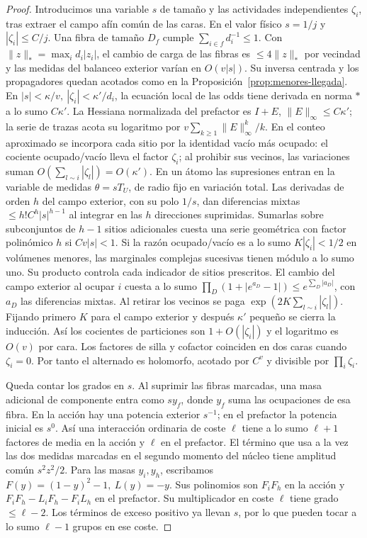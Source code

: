 \begin{proof}
Introducimos una variable \(s\) de tamaño y las actividades independientes \(\zeta_i\),
tras extraer el campo afín común de las caras. En el valor físico \(s=1/j\) y
\(|\zeta_i|\le C/j\). Una fibra de tamaño \(D_f\) cumple
\(\sum_{i\in f}d_i^{-1}\le1\). Con \(\|z\|_*=\max_i d_i|z_i|\), el cambio de carga
de las fibras es \(\le4\|z\|_*\) por vecindad y las medidas del balanceo exterior
varían en \(O(v|s|)\). Su inversa centrada y los propagadores quedan acotados como en
la Proposición~\ref{prop:menores-llegada}. En \(|s|<\kappa/v,\ |\zeta_i|<\kappa'/d_i\),
la ecuación local de las odds tiene derivada en norma \(*\) a lo sumo \(C\kappa'\).
La Hessiana normalizada del prefactor es \(I+E\), \(\|E\|_\infty\le C\kappa'\);
la serie de trazas acota su logaritmo por \(v\sum_{k\ge1}\|E\|_\infty^k/k\).
En el conteo aproximado se incorpora cada sitio por la identidad vacío más ocupado:
el cociente ocupado/vacío lleva el factor \(\zeta_i\); al prohibir sus vecinos, las
variaciones suman \(O(\sum_{l\sim i}|\zeta_l|)=O(\kappa')\). En un átomo las supresiones
entran en la variable de medidas \(\theta=sT_U\), de radio fijo en variación total.
Las derivadas de orden \(h\) del campo exterior, con su polo \(1/s\), dan diferencias
mixtas \(\le h! C^h|s|^{h-1}\) al integrar en las \(h\) direcciones suprimidas.
Sumarlas sobre subconjuntos de \(h-1\) sitios adicionales cuesta una serie geométrica
con factor polinómico \(h\) si \(Cv|s|<1\). Si la razón ocupado/vacío es a lo sumo
\(K|\zeta_i|<1/2\) en volúmenes menores, las marginales complejas sucesivas tienen
módulo a lo sumo uno. Su producto controla cada indicador de sitios prescritos. El
cambio del campo exterior al ocupar \(i\) cuesta a lo sumo
\(\prod_D(1+|e^{a_D}-1|)\le e^{\sum_D|a_D|}\), con \(a_D\) las diferencias mixtas.
Al retirar los vecinos se paga \(\exp(2K\sum_{l\sim i}|\zeta_l|)\). Fijando primero
\(K\) para el campo exterior y después \(\kappa'\) pequeño se cierra la inducción.
Así los cocientes de particiones son \(1+O(|\zeta_i|)\) y el logaritmo es \(O(v)\)
por cara. Los factores de silla y cofactor coinciden en dos caras cuando \(\zeta_i=0\).
Por tanto el alternado es holomorfo, acotado por \(C^v\) y divisible por \(\prod_i\zeta_i\).

Queda contar los grados en \(s\). Al suprimir las fibras marcadas, una masa adicional
de componente entra como \(s y_f\), donde \(y_f\) suma las ocupaciones de esa fibra.
En la acción hay una potencia exterior \(s^{-1}\); en el prefactor la potencia inicial
es \(s^0\). Así una interacción ordinaria de coste \(\ell\) tiene a lo sumo
\(\ell+1\) factores de media en la acción y \(\ell\) en el prefactor. El término que
usa a la vez las dos medidas marcadas en el segundo momento del núcleo tiene amplitud
común \(s^2 z^2/2\). Para las masas \(y_i,y_h\), escribamos
\(F(y)=(1-y)^2-1,\ L(y)=-y\). Sus polinomios son \(F_iF_h\) en la acción y
\(F_iF_h-L_iF_h-F_iL_h\) en el prefactor. Su multiplicador en coste \(\ell\)
tiene grado \(\le\ell-2\). Los términos de exceso positivo ya llevan \(s\), por lo
que pueden tocar a lo sumo \(\ell-1\) grupos en ese coste.


\end{proof}

